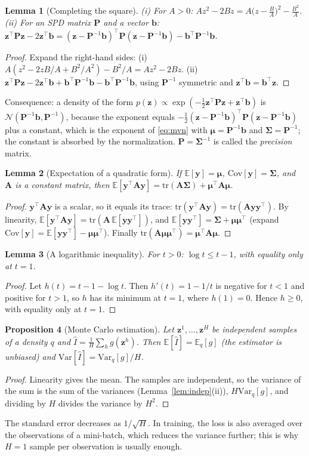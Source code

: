\documentclass[11pt,a4paper]{article}
\numberwithin{equation}{section}
\theoremstyle{plain}
\newtheorem{proposition}{Proposition}[section]
\newtheorem{lemma}[proposition]{Lemma}
\theoremstyle{definition}
\theoremstyle{remark}
\newcommand{\z}{\mathbf{z}}
\newcommand{\y}{\mathbf{y}}
\newcommand{\bb}{\mathbf{b}}
\newcommand{\mub}{\bm{\mu}}
\newcommand{\Sig}{\bm{\Sigma}}
\newcommand{\Ab}{\mathbf{A}}
\newcommand{\Pb}{\mathbf{P}}
\newcommand{\E}{\mathbb{E}}
\newcommand{\Var}{\mathrm{Var}}
\newcommand{\Cov}{\mathrm{Cov}}
\newcommand{\tr}{\mathrm{tr}}
\newcommand{\N}{\mathcal{N}}
\begin{document}
\begin{lemma}[Completing the square]
\label{lem:square}
(i) For $A>0$: $Az^2-2Bz=A\big(z-\tfrac BA\big)^2-\tfrac{B^2}A$.
(ii) For an SPD matrix $\Pb$ and a vector $\bb$: $\z^\top\Pb\z-2\z^\top\bb=(\z-\Pb^{-1}\bb)^\top\Pb(\z-\Pb^{-1}\bb)-\bb^\top\Pb^{-1}\bb$.
\end{lemma}
\begin{proof}
Expand the right-hand sides: (i) $A(z^2-2zB/A+B^2/A^2)-B^2/A=Az^2-2Bz$. (ii) $\z^\top\Pb\z-2\z^\top\bb+\bb^\top\Pb^{-1}\bb-\bb^\top\Pb^{-1}\bb$, using $\Pb^{-1}$ symmetric and $\z^\top\bb=\bb^\top\z$.
\end{proof}
Consequence: a density of the form $p(\z)\propto\exp(-\tfrac12\z^\top\Pb\z+\z^\top\bb)$ is $\N(\Pb^{-1}\bb,\Pb^{-1})$, because the exponent equals $-\tfrac12(\z-\Pb^{-1}\bb)^\top\Pb(\z-\Pb^{-1}\bb)$ plus a constant, which is the exponent of \eqref{eq:mvn} with $\mub=\Pb^{-1}\bb$ and $\Sig=\Pb^{-1}$; the constant is absorbed by the normalization. $\Pb=\Sig^{-1}$ is called the \emph{precision} matrix.

\begin{lemma}[Expectation of a quadratic form]
\label{lem:quadform}
If $\E[\y]=\mub$, $\Cov[\y]=\Sig$, and $\Ab$ is a constant matrix, then $\E[\y^\top\Ab\y]=\tr(\Ab\Sig)+\mub^\top\Ab\mub$.
\end{lemma}
\begin{proof}
$\y^\top\Ab\y$ is a scalar, so it equals its trace: $\tr(\y^\top\Ab\y)=\tr(\Ab\y\y^\top)$. By linearity, $\E[\y^\top\Ab\y]=\tr(\Ab\,\E[\y\y^\top])$, and $\E[\y\y^\top]=\Sig+\mub\mub^\top$ (expand $\Cov[\y]=\E[\y\y^\top]-\mub\mub^\top$). Finally $\tr(\Ab\mub\mub^\top)=\mub^\top\Ab\mub$.
\end{proof}

\begin{lemma}[A logarithmic inequality]
\label{lem:log}
For $t>0$: $\log t\le t-1$, with equality only at $t=1$.
\end{lemma}
\begin{proof}
Let $h(t)=t-1-\log t$. Then $h'(t)=1-1/t$ is negative for $t<1$ and positive for $t>1$, so $h$ has its minimum at $t=1$, where $h(1)=0$. Hence $h\ge0$, with equality only at $t=1$.
\end{proof}

\begin{proposition}[Monte Carlo estimation]
\label{prop:mc}
Let $\z^1,\dots,\z^H$ be independent samples of a density $q$ and $\hat I=\frac1H\sum_hg(\z^h)$. Then $\E[\hat I]=\E_q[g]$ (the estimator is unbiased) and $\Var[\hat I]=\Var_q[g]/H$.
\end{proposition}
\begin{proof}
Linearity gives the mean. The samples are independent, so the variance of the sum is the sum of the variances (Lemma~\ref{lem:indep}(ii)), $H\Var_q[g]$, and dividing by $H$ divides the variance by $H^2$.
\end{proof}
The standard error decreases as $1/\sqrt H$. In training, the loss is also averaged over the observations of a mini-batch, which reduces the variance further; this is why $H=1$ sample per observation is usually enough.
\end{document}

